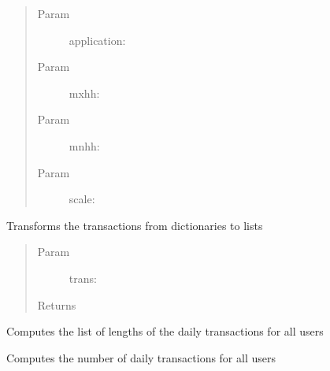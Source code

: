 \documentclass[letterpaper,10pt,english]{sphinxmanual}
\begin{document}
\begin{fulllineitems}
\begin{fulllineitems}
\begin{quote}
\begin{description}
\item[{Param }] \leavevmode
application:

\item[{Param }] \leavevmode
mxhh:

\item[{Param }] \leavevmode
mnhh:

\item[{Param }] \leavevmode
scale:

\end{description}\end{quote}

\end{fulllineitems}


\begin{fulllineitems}
\label{index:SuperHub.Transactions.DailyTransactions.serialize}
Transforms the transactions from dictionaries to lists
\begin{quote}\begin{description}
\item[{Param }] \leavevmode
trans:

\item[{Returns}] \leavevmode


\end{description}\end{quote}

\end{fulllineitems}


\begin{fulllineitems}
\label{index:SuperHub.Transactions.DailyTransactions.users_daily_length}
Computes the list of lengths of the daily transactions for all users

\end{fulllineitems}


\begin{fulllineitems}
\label{index:SuperHub.Transactions.DailyTransactions.users_prevalence}
Computes the number of daily transactions for all users

\end{fulllineitems}


\end{fulllineitems}
\end{document}
